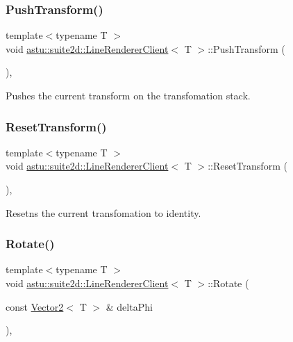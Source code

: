 \subsubsection{\texorpdfstring{Push\+Transform()}{PushTransform()}}
{\footnotesize\ttfamily template$<$typename T $>$ \\
void \hyperlink{classastu_1_1suite2d_1_1LineRendererClient}{astu\+::suite2d\+::\+Line\+Renderer\+Client}$<$ T $>$\+::Push\+Transform (\begin{DoxyParamCaption}{ }\end{DoxyParamCaption})\hspace{0.3cm}{\ttfamily [inline]}, {\ttfamily [protected]}}

Pushes the current transform on the transfomation stack. \mbox{\label{classastu_1_1suite2d_1_1LineRendererClient_a6970478206086858fdbd3e7f61e58dce}} 
\subsubsection{\texorpdfstring{Reset\+Transform()}{ResetTransform()}}
{\footnotesize\ttfamily template$<$typename T $>$ \\
void \hyperlink{classastu_1_1suite2d_1_1LineRendererClient}{astu\+::suite2d\+::\+Line\+Renderer\+Client}$<$ T $>$\+::Reset\+Transform (\begin{DoxyParamCaption}{ }\end{DoxyParamCaption})\hspace{0.3cm}{\ttfamily [inline]}, {\ttfamily [protected]}}

Resetns the current transfomation to identity. \mbox{\label{classastu_1_1suite2d_1_1LineRendererClient_a983316c99756edd2033161b36eec0a4a}} 
\subsubsection{\texorpdfstring{Rotate()}{Rotate()}}
{\footnotesize\ttfamily template$<$typename T $>$ \\
void \hyperlink{classastu_1_1suite2d_1_1LineRendererClient}{astu\+::suite2d\+::\+Line\+Renderer\+Client}$<$ T $>$\+::Rotate (\begin{DoxyParamCaption}\item[{const \hyperlink{classastu_1_1Vector2}{Vector2}$<$ T $>$ \&}]{delta\+Phi }\end{DoxyParamCaption})\hspace{0.3cm}{\ttfamily [inline]}, {\ttfamily [protected]}}

